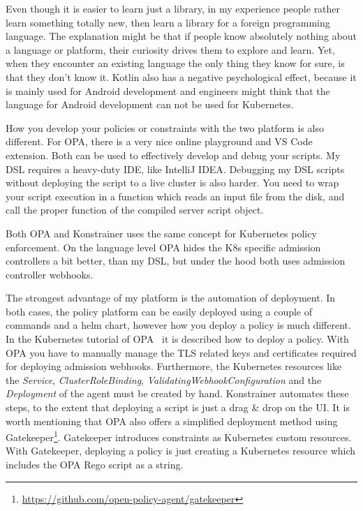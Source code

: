 Even though it is easier to learn just a library, in my experience people rather learn something totally new, then learn a library for a foreign programming language. The explanation might be that if people know absolutely nothing about a language or platform, their curiosity drives them to explore and learn. Yet, when they encounter an existing language the only thing they know for sure, is that they don't know it. Kotlin also has a negative psychological effect, because it is mainly used for Android development and engineers might think that the language for Android development can not be used for Kubernetes.

How you develop your policies or constraints with the two platform is also different. For OPA, there is a very nice online playground and VS Code extension. Both can be used to effectively develop and debug your scripts. My DSL requires a heavy-duty IDE, like IntelliJ IDEA. Debugging my DSL scripts without deploying the script to a live cluster is also harder. You need to wrap your script execution in a function which reads an input file from the disk, and call the proper function of the compiled server script object.

Both OPA and Konstrainer uses the same concept for Kubernetes policy enforcement. On the language level OPA hides the K8s specific admission controllers a bit better, than my DSL, but under the hood both uses admission controller webhooks.

The strongest advantage of my platform is the automation of deployment. In both cases, the policy platform can be easily deployed using a couple of commands and a helm chart, however how you deploy a policy is much different. In the Kubernetes tutorial of OPA~\cite{OPA} it is described how to deploy a policy. With OPA you have to manually manage the TLS related keys and certificates required for deploying admission webhooks. Furthermore, the Kubernetes resources like the \emph{Service}, \emph{ClusterRoleBinding}, \emph{ValidatingWebhookConfiguration} and the \emph{Deployment} of the agent must be created by hand. Konstrainer automates these steps, to the extent that deploying a script is just a drag \& drop on the UI. It is worth mentioning that OPA also offers a simplified deployment method using Gatekeeper\footnote{\url{https://github.com/open-policy-agent/gatekeeper}}. Gatekeeper introduces constraints as Kubernetes custom resources. With Gatekeeper, deploying a policy is just creating a Kubernetes resource which includes the OPA Rego script as a string.


